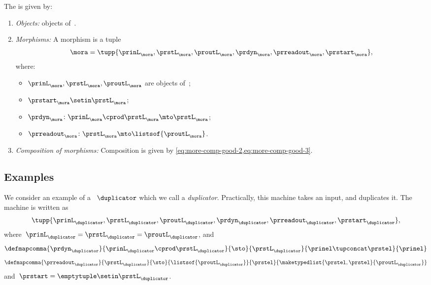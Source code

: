 {\begin{definition}[\More]
    \label{def:More}
    The  \More is given by:
    \begin{enumerate}
        \item \emph{Objects:} objects of~\SetL.
        \item \emph{Morphisms:}
              A morphism is a tuple
              \begin{equation}
                  \mora = \tupp{\prinL_{\mora},\prstL_{\mora}, \proutL_{\mora},\prdyn_{\mora},\prreadout_{\mora},\prstart_{\mora}},
              \end{equation}
              where:
              \begin{itemize}
                  \item $\prinL_{\mora},\prstL_{\mora}, \proutL_{\mora}$ are objects of~\SetL;
                  \item $\prstart_{\mora} \setin \prstL_{\mora}$;
                  \item $ \prdyn_{\mora} \colon \prinL_{\mora} \cprod \prstL_{\mora} \mto \prstL_{\mora}$;
                  \item $ \prreadout_{\mora} \colon \prstL_{\mora} \mto \listsof{\proutL_{\mora}}$.
              \end{itemize}
        \item \emph{Composition of morphisms:}
              Composition is given by \cref{eq:more-comp-good-2,eq:more-comp-good-3}.
    \end{enumerate}
\end{definition}

\subsection{Examples}

\begin{example}[Duplicator]
    We consider an example of a ~$\duplicator$ which we call a \emph{duplicator}.
    Practically, this machine takes an input, and duplicates it.
    The machine is written as
    \begin{equation}
        \tupp{\prinL_{\duplicator},\prstL_{\duplicator},\proutL_{\duplicator},\prdyn_{\duplicator},\prreadout_{\duplicator},\prstart_{\duplicator}},
    \end{equation}
    where~$\prinL_{\duplicator}=\prstL_{\duplicator}=\proutL_\duplicator$, and
    \begin{equation}
        \defmapcomma{\prdyn_\duplicator}
        {\prinL_\duplicator \cprod \prstL_\duplicator}
        {\sto}
        {\prstL_\duplicator}
        {\prinel \tupconcat \prstel}
        {\prinel}
    \end{equation}
    \begin{equation}
        \defmapcomma{\prreadout_\duplicator}
        {\prstL_\duplicator}
        {\sto}
        {\listsof{\proutL_\duplicator}}
        {\prstel}
        {\maketypedlist{\prstel,\prstel}{\proutL_\duplicator}}
    \end{equation}
    and~$\prstart=\emptytuple \setin \prstL_\duplicator$.
\end{example}

}
